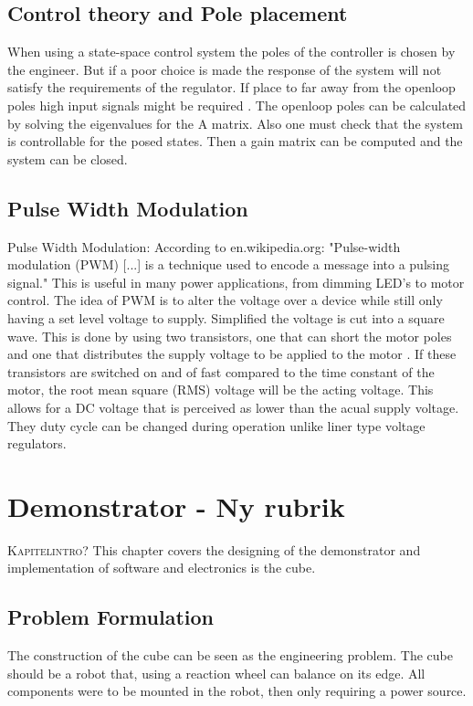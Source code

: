 \documentclass[a4paper,11pt]{kth-mag}
\begin{document}
 
\section{Control theory and Pole placement}
When using a state-space control system the poles of the controller is chosen by the engineer. But if a poor choice
is made the response of the system will not satisfy the requirements of the regulator. If place to far away from the 
openloop poles high input signals might be required \cite{regler}. The openloop poles can be calculated by solving the eigenvalues 
for the A matrix. Also one must check that the system is controllable for the posed states. Then a gain matrix can 
be computed and the system can be closed.

\section{Pulse Width Modulation}
Pulse Width Modulation:
According to en.wikipedia.org: "Pulse-width modulation (PWM) [...] is a technique used to encode a message into a 
pulsing signal."
This is useful in many power applications, from dimming LED's to motor control. The idea of 
PWM is to alter the voltage over a device while still only having a set level voltage to supply. Simplified  
the voltage is cut into a square wave. This is done by using two transistors, one that can short the motor poles and one that distributes the supply voltage to be applied to the motor \cite{elektro}. If these transistors are switched on and of fast 
compared to the time constant of the motor, the root mean square (RMS) voltage will be the acting voltage.
This allows for a DC voltage that is perceived as lower than the acual supply voltage.
They duty cycle can be changed during operation unlike liner type voltage regulators. 

 
\chapter{Demonstrator - Ny rubrik}

\textsc{Kapitelintro?}
This chapter covers the designing of the demonstrator and implementation of software and electronics is the cube.

\section{Problem Formulation}
The construction of the cube can be seen as the engineering problem. The cube should be a robot that,
using a reaction wheel can balance on its edge. All components were to be mounted in the robot, then only 
requiring a power source. 
\end{document}
